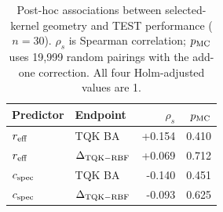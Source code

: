 \begin{table}[t]
\caption{Post-hoc associations between selected-kernel geometry and TEST performance ($n=30$). $\rho_s$ is Spearman correlation; $p_{\rm MC}$ uses 19,999 random pairings with the add-one correction. All four Holm-adjusted values are 1.}
\label{tab:geometry-associations}
\centering
\small
\setlength{\tabcolsep}{4pt}
\begin{tabular}{llrr}
\toprule
Predictor & Endpoint & $\rho_s$ & $p_{\rm MC}$ \\
\midrule
$r_{\rm eff}$ & TQK BA & +0.154 & 0.410 \\
$r_{\rm eff}$ & $\Delta_{\rm TQK-RBF}$ & +0.069 & 0.712 \\
$c_{\rm spec}$ & TQK BA & -0.140 & 0.451 \\
$c_{\rm spec}$ & $\Delta_{\rm TQK-RBF}$ & -0.093 & 0.625 \\
\bottomrule
\end{tabular}
\end{table}
